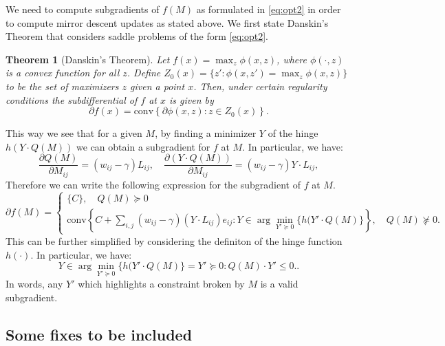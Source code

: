 \documentclass{article}
\newtheorem{theorem}{Theorem}[section]
\begin{document}
We need to compute subgradients of $f(M)$ as formulated in \eqref{eq:opt2} in order to compute mirror descent updates as stated above. We first state Danskin's Theorem \cite{danskin} that considers saddle problems of the form \eqref{eq:opt2}.

\begin{theorem}[Danskin's Theorem]
  Let $f(x) = \max_z \phi(x,z)$, where $\phi(\cdot,z)$ is a convex function for all $z$. Define $Z_0(x) = \{z' : \phi(x,z') = \max_z \phi(x,z)\}$ to be the set of maximizers $z$ given a point $x$. Then, under certain regularity conditions the subdifferential of $f$ at $x$ is given by 
  \[ \partial f(x) = \mathrm{conv}\left\{ \partial \phi(x,z) : z \in Z_0(x)\right\}. \]
\end{theorem}

This way we see that for a given $M$, by finding a minimizer $Y$ of the hinge  $h(Y \cdot Q(M))$ we can obtain a subgradient for $f$ at $M$. 
In particular, we have: 
\[ \frac{\partial Q(M)}{\partial M_{ij}} = (w_{ij} - \gamma) L_{ij}, \quad \frac{\partial (Y \cdot Q(M))}{\partial M_{ij}} = (w_{ij} - \gamma) Y \cdot L_{ij}, \]
Therefore we can write the following expression for the subgradient of $f$ at $M$.
\[ \partial f(M) = \begin{cases}
			\{C\}, \quad Q(M) \succeq 0 \\
			\mathrm{conv}\left\{C + \sum_{i,j} (w_{ij} - \gamma) \left(Y \cdot L_{ij} \right) e_{ij} : 
			Y \in \arg\min_{Y' \succeq 0} \{h(Y' \cdot Q(M)\} \right\}, \quad Q(M) \not\succeq 0.
			\end{cases} \]
This can be further simplified by considering the definiton of the hinge function $h(\cdot).$
In particular, we have:
$$
Y \in \arg\min_{Y' \succeq 0} \{h(Y' \cdot Q(M)\} = {Y' \succeq 0 : Q(M) \cdot Y' \leq 0.}.
$$
In words, any $Y'$ which highlights a constraint broken by $M$ is a valid subgradient.

\subsection{Some fixes to be included}
\end{document}
